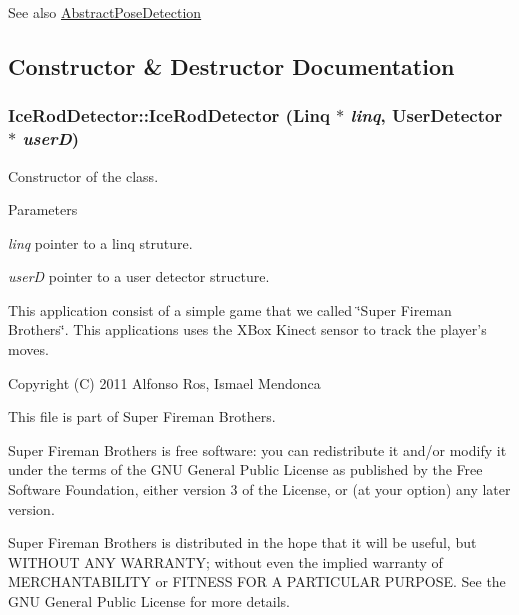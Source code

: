 \begin{DoxySeeAlso}{See also}
\hyperlink{classAbstractPoseDetection}{AbstractPoseDetection} 
\end{DoxySeeAlso}


\subsection{Constructor \& Destructor Documentation}
\hypertarget{classIceRodDetector_a1685f8a0502d55e9ab1c5b08c27c286d}{
\subsubsection[{IceRodDetector}]{\setlength{\rightskip}{0pt plus 5cm}IceRodDetector::IceRodDetector ({\bf Linq} $\ast$ {\em linq}, \/  {\bf UserDetector} $\ast$ {\em userD})}}
\label{classIceRodDetector_a1685f8a0502d55e9ab1c5b08c27c286d}
Constructor of the class. 
\begin{DoxyParams}{Parameters}
\item[{\em linq}]pointer to a linq struture. \item[{\em userD}]pointer to a user detector structure.\end{DoxyParams}
This application consist of a simple game that we called \char`\"{}Super Fireman Brothers\char`\"{}. This applications uses the XBox Kinect sensor to track the player's moves.

Copyright (C) 2011 Alfonso Ros, Ismael Mendonca

This file is part of Super Fireman Brothers.

Super Fireman Brothers is free software: you can redistribute it and/or modify it under the terms of the GNU General Public License as published by the Free Software Foundation, either version 3 of the License, or (at your option) any later version.

Super Fireman Brothers is distributed in the hope that it will be useful, but WITHOUT ANY WARRANTY; without even the implied warranty of MERCHANTABILITY or FITNESS FOR A PARTICULAR PURPOSE. See the GNU General Public License for more details.

